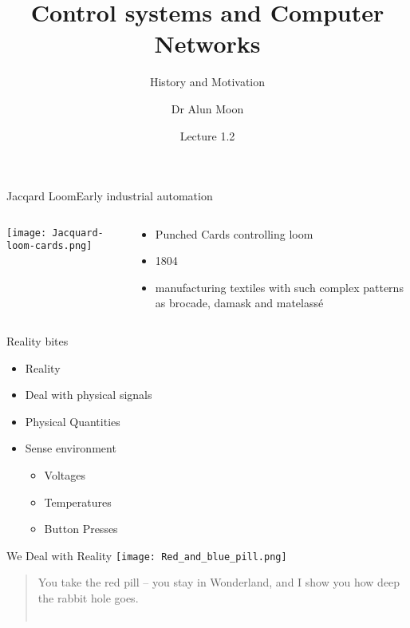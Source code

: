 \documentclass[xcolor=svgnames]{beamer}
\title{Control systems and Computer Networks}
\subtitle{History and Motivation}
\author{Dr Alun Moon}
\date{Lecture 1.2}
\begin{document}
\frame{\maketitle}

\begin{frame}{Jacqard Loom}{Early industrial automation}
\begin{columns}[onlytextwidth]
\begin{column}{.6\textwidth}
    \texttt{[image: Jacquard-loom-cards.png]}
\end{column}
\begin{column}{.4\textwidth}
    \begin{itemize}
        \item Punched Cards controlling loom
        \item 1804
        \item manufacturing textiles with such complex patterns as brocade, damask and matelassé
    \end{itemize}
\end{column}
\end{columns}
\end{frame}

\newcommand\redout{\bgroup\markoverwith
{\textcolor{red}{\rule[0.3ex]{2pt}{2pt}}}\ULon}
\begin{frame}{Reality bites}
    \begin{itemize}
        \item {}\only<2->{\redout{Virtual}} Reality
        \item Deal with physical signals
        \item Physical Quantities
        \item Sense environment
        \begin{itemize}
          \item Voltages
          \item Temperatures
          \item Button Presses
        \end{itemize}
    \end{itemize}
\end{frame}

\begin{frame}{We Deal with Reality}
    \texttt{[image: Red\_and\_blue\_pill.png]}\\
    \pause
    \begin{quote}
        You take the red pill -- you stay in Wonderland, and I show you how deep the rabbit hole goes.\\
        ~\hspace*{\fill}{\textit Morpheus, The Matrix}
    \end{quote}
\end{frame}
\end{document}
